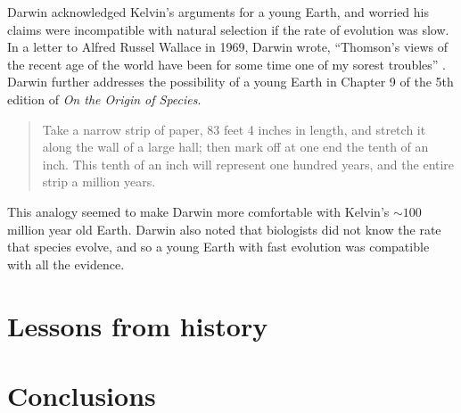 \documentclass[12pt]{article}
\begin{document}

Darwin acknowledged Kelvin's arguments for a young Earth, and worried his claims were incompatible with natural selection if the rate of evolution was slow. In a letter to Alfred Russel Wallace in 1969, Darwin wrote, ``Thomson's views of the recent age of the world have been for some time one of my sorest troubles'' \citep{Marchant_1916}. Darwin further addresses the possibility of a young Earth in Chapter 9 of the 5th edition of \emph{On the Origin of Species}. 

\begin{quote}
  Take a narrow strip of paper, 83 feet 4 inches in length, and stretch it along the wall of a large hall; then mark off at one end the tenth of an inch. This tenth of an inch will represent one hundred years, and the entire strip a million years. \citep{Darwin_1869}
\end{quote}
This analogy seemed to make Darwin more comfortable with Kelvin's $\sim 100$ million year old Earth. Darwin also noted that biologists did not know the rate that species evolve, and so a young Earth with fast evolution was compatible with all the evidence.

\section{Lessons from history}

\section{Conclusions}



\end{document}
